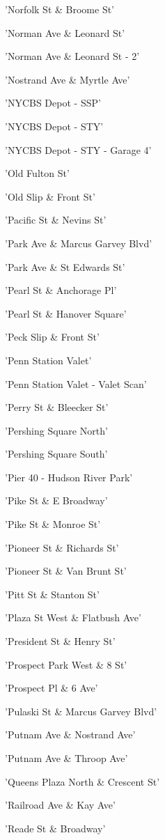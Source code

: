 \documentclass[11pt]{article}
\begin{document}
\begin{enumerate*}
\item 'Norfolk St \& Broome St'
\item 'Norman Ave \& Leonard St'
\item 'Norman Ave \& Leonard St - 2'
\item 'Nostrand Ave \& Myrtle Ave'
\item 'NYCBS Depot - SSP'
\item 'NYCBS Depot - STY'
\item 'NYCBS Depot - STY - Garage 4'
\item 'Old Fulton St'
\item 'Old Slip \& Front St'
\item 'Pacific St \& Nevins St'
\item 'Park Ave \& Marcus Garvey Blvd'
\item 'Park Ave \& St Edwards St'
\item 'Pearl St \& Anchorage Pl'
\item 'Pearl St \& Hanover Square'
\item 'Peck Slip \& Front St'
\item 'Penn Station Valet'
\item 'Penn Station Valet - Valet Scan'
\item 'Perry St \& Bleecker St'
\item 'Pershing Square North'
\item 'Pershing Square South'
\item 'Pier 40 - Hudson River Park'
\item 'Pike St \& E Broadway'
\item 'Pike St \& Monroe St'
\item 'Pioneer St \& Richards St'
\item 'Pioneer St \& Van Brunt St'
\item 'Pitt St \& Stanton St'
\item 'Plaza St West \& Flatbush Ave'
\item 'President St \& Henry St'
\item 'Prospect Park West \& 8 St'
\item 'Prospect Pl \& 6 Ave'
\item 'Pulaski St \& Marcus Garvey Blvd'
\item 'Putnam Ave \& Nostrand Ave'
\item 'Putnam Ave \& Throop Ave'
\item 'Queens Plaza North \& Crescent St'
\item 'Railroad Ave \& Kay Ave'
\item 'Reade St \& Broadway'

\end{enumerate*}
\end{document}
